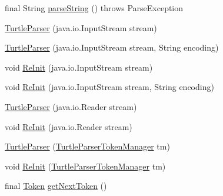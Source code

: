 \begin{DoxyCompactItemize}
\item 
final String \hyperlink{classuk_1_1ac_1_1manchester_1_1cs_1_1owl_1_1owlapi_1_1turtle_1_1parser_1_1_turtle_parser_a69051c96cf52e37c137557bb97ae2d0d}{parse\-String} ()  throws Parse\-Exception 
\item 
\hyperlink{classuk_1_1ac_1_1manchester_1_1cs_1_1owl_1_1owlapi_1_1turtle_1_1parser_1_1_turtle_parser_aec51da29be542f04f81bcb46f1430444}{Turtle\-Parser} (java.\-io.\-Input\-Stream stream)
\item 
\hyperlink{classuk_1_1ac_1_1manchester_1_1cs_1_1owl_1_1owlapi_1_1turtle_1_1parser_1_1_turtle_parser_a06c6e1f9174ea63df549f8cae20130c1}{Turtle\-Parser} (java.\-io.\-Input\-Stream stream, String encoding)
\item 
void \hyperlink{classuk_1_1ac_1_1manchester_1_1cs_1_1owl_1_1owlapi_1_1turtle_1_1parser_1_1_turtle_parser_ae27c0d645ee47585aa215acd2d6291f6}{Re\-Init} (java.\-io.\-Input\-Stream stream)
\item 
void \hyperlink{classuk_1_1ac_1_1manchester_1_1cs_1_1owl_1_1owlapi_1_1turtle_1_1parser_1_1_turtle_parser_a64cb60a6aea7fd62e1139cbffa704b5c}{Re\-Init} (java.\-io.\-Input\-Stream stream, String encoding)
\item 
\hyperlink{classuk_1_1ac_1_1manchester_1_1cs_1_1owl_1_1owlapi_1_1turtle_1_1parser_1_1_turtle_parser_a26987d72fb25c9d57d75aaf8f2cef4c8}{Turtle\-Parser} (java.\-io.\-Reader stream)
\item 
void \hyperlink{classuk_1_1ac_1_1manchester_1_1cs_1_1owl_1_1owlapi_1_1turtle_1_1parser_1_1_turtle_parser_ab4736d6e62072e0f8e71b211043e5965}{Re\-Init} (java.\-io.\-Reader stream)
\item 
\hyperlink{classuk_1_1ac_1_1manchester_1_1cs_1_1owl_1_1owlapi_1_1turtle_1_1parser_1_1_turtle_parser_aea6be8a88fd3194ac38e72e28c91b97f}{Turtle\-Parser} (\hyperlink{classuk_1_1ac_1_1manchester_1_1cs_1_1owl_1_1owlapi_1_1turtle_1_1parser_1_1_turtle_parser_token_manager}{Turtle\-Parser\-Token\-Manager} tm)
\item 
void \hyperlink{classuk_1_1ac_1_1manchester_1_1cs_1_1owl_1_1owlapi_1_1turtle_1_1parser_1_1_turtle_parser_aa92da097700d6ee4bf57a9f93581758a}{Re\-Init} (\hyperlink{classuk_1_1ac_1_1manchester_1_1cs_1_1owl_1_1owlapi_1_1turtle_1_1parser_1_1_turtle_parser_token_manager}{Turtle\-Parser\-Token\-Manager} tm)
\item 
final \hyperlink{classuk_1_1ac_1_1manchester_1_1cs_1_1owl_1_1owlapi_1_1turtle_1_1parser_1_1_token}{Token} \hyperlink{classuk_1_1ac_1_1manchester_1_1cs_1_1owl_1_1owlapi_1_1turtle_1_1parser_1_1_turtle_parser_ac788f83421857146e279f09640351f95}{get\-Next\-Token} ()

\end{DoxyCompactItemize}
